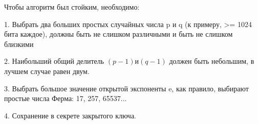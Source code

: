 Чтобы алгоритм был стойким, необходимо:

1. Выбрать два больших простых случайных числа p и q (к примеру, >= 1024 бита каждое), должны быть не слишком различными и быть не слишком близкими

2. Наибольший общий делитель $(p-1) и (q-1)$ должен быть небольшим, в лучшем случае равен двум.

3. Выбрать большое значение открытой экспоненты e, как правило, выбирают простые числа Ферма: 17, 257, 65537...

4. Сохранение в секрете закрытого ключа.